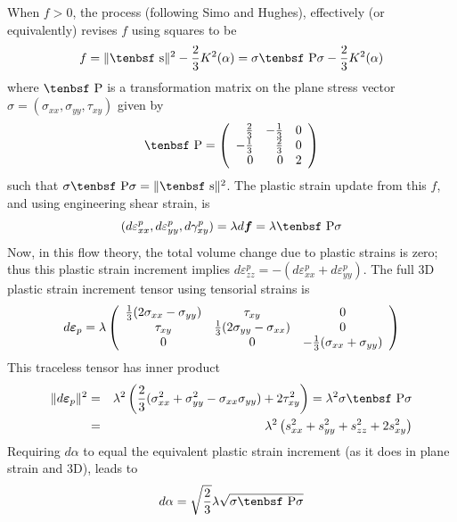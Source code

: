 \documentclass[11pt]{book}
\renewcommand{\vec}[1]{\boldsymbol{#1}}
\def\dev{\hbox{\tenbsf s}}
\def\dpl{d \vec{\varepsilon}_{p}}
\def\df{d \vec{f}}
\def\P{\hbox{\tenbsf P}}
\def\s#1{\sigma_{#1}}
\begin{document}
When $f>0$, the process (following Simo and Hughes), effectively (or equivalently) revises $f$ using squares to be
\begin{equation}
       f = \|\dev\|^2 - {2\over 3}K^2(\alpha) = \sigma \P\sigma - {2\over 3}K^2(\alpha)
\end{equation}
where $\P$ is a transformation matrix on the plane stress vector $\sigma = (\s{xx}, \s{yy}, \tau_{xy})$ given by
\begin{equation}
          \P = \left( \begin{array}{rrr}
                    {2\over 3} & -{1\over 3} & 0 \\ 
                    -{1\over 3} & {2\over 3} & 0 \\ 0 & 0 & 2 \end{array}\right)
\end{equation}
such that $\sigma \P\sigma = \|\dev\|^2$. The plastic strain update from this $f$, and using engineering shear strain, is
\begin{equation}
     (d\varepsilon_{xx}^p,  d\varepsilon_{yy}^p, d\gamma_{xy}^p) = \lambda \df = \lambda \P\sigma
\end{equation}
Now, in this flow theory, the total volume change due to plastic strains is zero; thus this plastic strain increment implies $d\varepsilon_{zz}^p = - (d\varepsilon_{xx}^p + d\varepsilon_{yy}^p)$. The full 3D plastic strain increment tensor using tensorial strains is
\begin{equation}
          \dpl = \lambda \left( \begin{array}{ccc}
                    {1\over 3}(2\s{xx}-\s{yy})& \tau_{xy} & 0 \\ 
                    \tau_{xy} & {1\over 3}(2\s{yy}-\s{xx}) & 0 \\ 0 & 0 & -{1\over 3}(\s{xx}+\s{yy}) \end{array}\right)
\end{equation}
This traceless tensor has inner product
\begin{eqnarray}
  \|\dpl\|^2 & = & \lambda^2 \left( {2\over 3}(\s{xx}^2 + \s{yy}^2 - \s{xx}\s{yy}) + 2\tau_{xy}^2\right) = \lambda^2 \sigma \P\sigma \\
      & = & \lambda^2 \left( s_{xx}^2 + s_{yy}^2 + s_{zz}^2 + 2s_{xy}^2\right)
\end{eqnarray}
Requiring $d\alpha$ to equal the equivalent plastic strain increment (as it does in plane strain and 3D), leads to
\begin{equation}
        d\alpha = \sqrt{2\over3}\lambda \sqrt{\sigma \P\sigma}
\end{equation}
\end{document}
